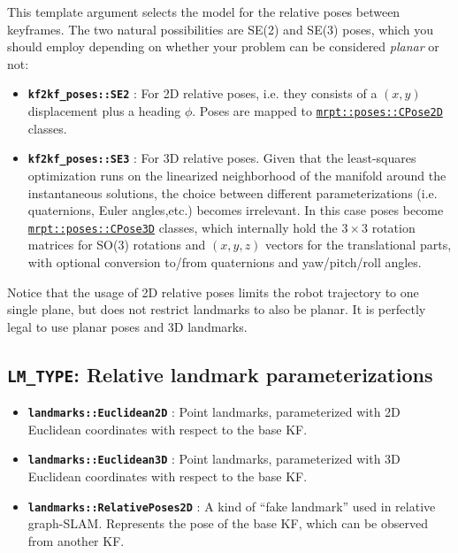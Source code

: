 \documentclass[a4paper,11pt]{article}
\begin{document}
This template argument selects the model for the relative poses between keyframes. 
The two natural possibilities are SE(2) and SE(3) poses, which you should employ 
depending on whether your problem can be considered \emph{planar} or not:

\begin{itemize}
\item{\textbf{ \texttt{kf2kf\_poses::SE2} }: For 2D relative poses, i.e. they consists of a $(x,y)$ displacement 
plus a heading $\phi$. Poses are mapped to 
\href{http://reference.mrpt.org/stable/classmrpt_1_1poses_1_1_c_pose2_d.html}
{\texttt{mrpt::poses::CPose2D}} classes. 
}
\item{\textbf{ \texttt{kf2kf\_poses::SE3} }: For 3D relative poses. Given that the least-squares optimization runs 
on the linearized neighborhood of the manifold \cite{blanco2010tutorial} around the instantaneous solutions, the 
choice between different parameterizations (i.e. quaternions, Euler angles,etc.) becomes irrelevant. 
In this case poses become 
\href{http://reference.mrpt.org/stable/classmrpt_1_1poses_1_1_c_pose3_d.html}
{\texttt{mrpt::poses::CPose3D}}
classes, which internally hold the $3 \times 3$ rotation matrices for SO(3) rotations and $(x,y,z)$ vectors 
for the translational parts, with optional conversion to/from quaternions and yaw/pitch/roll angles.
}
\end{itemize}

Notice that the usage of 2D relative poses limits the robot trajectory to one single plane, but 
does not restrict landmarks to also be planar. 
It is perfectly legal to use planar poses and 3D landmarks.


\subsection{\texttt{LM\_TYPE}: Relative landmark parameterizations}
\label{sec:k2f_types}

\begin{itemize}
\item{\textbf{ \texttt{landmarks::Euclidean2D} }: Point landmarks, parameterized with 2D Euclidean coordinates with respect to the base KF.
}
\item{\textbf{ \texttt{landmarks::Euclidean3D} }: Point landmarks, parameterized with 3D Euclidean coordinates with respect to the base KF.
}
\item{\textbf{ \texttt{landmarks::RelativePoses2D} }: A kind of ``fake landmark'' used in relative graph-SLAM. 
Represents the pose of the base KF, which can be observed from another KF.}
\end{itemize}
\end{document}
